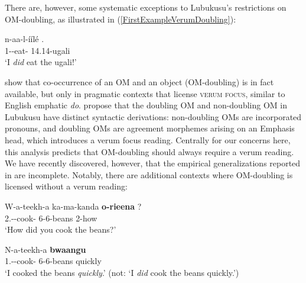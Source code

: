 \documentclass[output=paper]{langscibook}
\begin{document}
There are, however, some systematic exceptions to Lubukusu's restrictions on OM-doubling, as illustrated in (\ref{FirstExampleVerumDoubling}):

\begin{exe}  \ex \label{FirstExampleVerumDoubling}
\gll n-aa-l-íílé	. \\
1\Sm-\Om-eat-\Pfv{}	14.14-ugali \\
\glt `I \textit{did} eat the ugali!'  \citep[360]{SikukuEtAl:2018:LubukusuOM} %
\end{exe} 

\citet{SikukuEtAl:2018:LubukusuOM} show that co-occurrence of an OM and an object (OM-doubling) is in fact available, but only in pragmatic contexts that license \textsc{verum focus}, similar to English emphatic \textit{do}. \citet{SikukuEtAl:2018:LubukusuOM} propose that the doubling OM and non-doubling OM in Lubukusu have distinct syntactic derivations: non-doubling OMs are incorporated pronouns, and doubling OMs are agreement morphemes arising on an Emphasis head, which introduces a verum focus reading. Centrally for our concerns here, this analysis predicts that OM-doubling should always require a verum reading. We have recently discovered, however, that the empirical generalizations reported in \citet{SikukuEtAl:2018:LubukusuOM} are incomplete. Notably, there are additional contexts where OM-doubling is licensed without a verum reading: 

\ea \label{ex:sikuku:FirstNewExMannerAdverbial}
\begin{xlist}
\gll W-a-teekh-a ka-ma-kanda \textbf{o-rieena} ? \\
2\Sg.\Sm-\Pst-cook-\Fv{}	6-6-beans	2\Sg-how \\ %
\glt `How did you cook the beans?'

 \label{DoublingFocusedMannerAdverb}
\gll N-a-teekh-a  \textbf{bwaangu} \\
1\Sg.\Sm-\Om-cook-\Fv{} 6-6-beans quickly \\
    \glt ‘I cooked the beans \textit{quickly}.’ (not: `I \textit{did} cook the beans quickly.’) 

\end{xlist}
\z 
\end{document}
